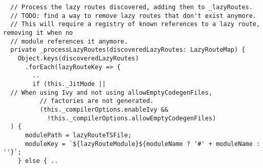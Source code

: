 \begin{verbatim}
  // Process the lazy routes discovered, adding then to _lazyRoutes.
  // TODO: find a way to remove lazy routes that don't exist anymore.
  // This will require a registry of known references to a lazy route,
removing it when no
  // module references it anymore.
  private _processLazyRoutes(discoveredLazyRoutes: LazyRouteMap) {
    Object.keys(discoveredLazyRoutes)
      .forEach(lazyRouteKey => {
        ..
        if (this._JitMode ||
  // When using Ivy and not using allowEmptyCodegenFiles,
          // factories are not generated.
          (this._compilerOptions.enableIvy &&
            !this._compilerOptions.allowEmptyCodegenFiles)
  ) {
      modulePath = lazyRouteTSFile;
      moduleKey = `${lazyRouteModule}${moduleName ? '#' + moduleName : ''}`;
    } else { ..
\end{verbatim}
